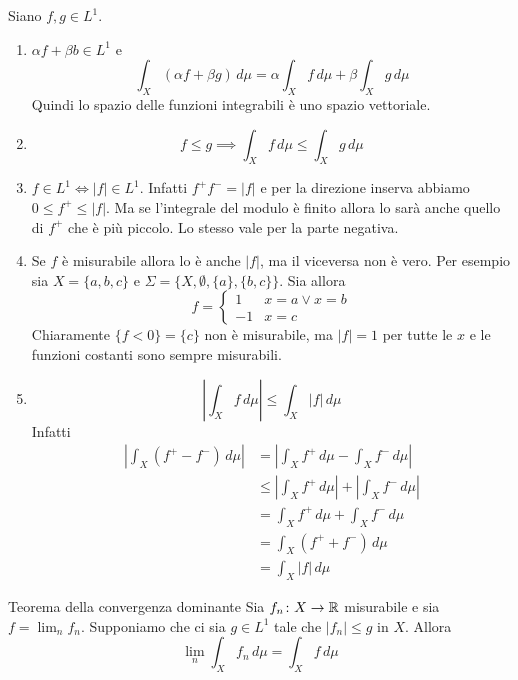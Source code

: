 \documentclass[a4paper]{article}
\begin{document}
\begin{snippetproposition}{}
    Siano \(f,g \in L^1\).
    \begin{enumerate}
        \item \(\alpha f + \beta b \in L^1\) e \[
            \int_X (\alpha f + \beta g)\,d\mu = \alpha \int_X f\,d\mu + \beta \int_X g\,d\mu
        \]
        Quindi lo spazio delle funzioni integrabili è uno spazio vettoriale.
        \item  \[
            f \leq g \implies \int_X f\,d\mu \leq \int_X g\,d\mu
        \]
        \item \(f \in L^1 \iff |f| \in L^1\). Infatti \(f^+ f^- = |f|\) e per la direzione inserva
        abbiamo \(0 \leq f^+ \leq |f|\). Ma se l'integrale del modulo è finito allora lo sarà anche quello
        di \(f^+\) che è più piccolo. Lo stesso vale per la parte negativa.
        \item Se \(f\) è misurabile allora lo è anche \(|f|\), ma il viceversa non è vero.
        Per esempio sia \(X = \{a,b,c\}\) e \(\Sigma = \{X, \emptyset, \{a\}, \{b, c\}\}\).
        Sia allora
        \[
            f = \begin{cases}
                1 & x=a \lor x=b \\
                -1 & x = c
            \end{cases}
        \]
        Chiaramente \(\{f < 0\} = \{c\}\) non è misurabile, ma \(|f| = 1\) per tutte le \(x\)
        e le funzioni costanti sono sempre misurabili.
        \item \[
            \left|\int_X f\,d\mu\right| \leq \int_X |f|\,d\mu
        \]
        Infatti
        \begin{align*}
            \left|\int_X (f^+ - f^-)\,d\mu\right| &= \left|\int_X f^+\,d\mu - \int_X f^-\,d\mu\right| \\
            &\leq \left|\int_X f^+\,d\mu\right| + \left|\int_X f^-\,d\mu\right| \\
            &= \int_X f^+ \,d\mu + \int_X f^- \,d\mu \\
            &= \int_X (f^+ + f^-)\,d\mu \\
            &= \int_X |f| \,d\mu 
        \end{align*}
    \end{enumerate}
\end{snippetproposition}

\begin{snippettheorem}{Teorema della convergenza dominante}
    Sia \(f_n \colon X \to \mathbb{R}\) misurabile e sia \(f = \lim_n f_n\).
    Supponiamo che ci sia \(g\in L^1\) tale che \(|f_n| \leq g\) in \(X\).
    Allora
    \[
        \lim_n \int_X f_n\,d\mu = \int_X f\,d\mu
    \]
\end{snippettheorem}
\end{document}
